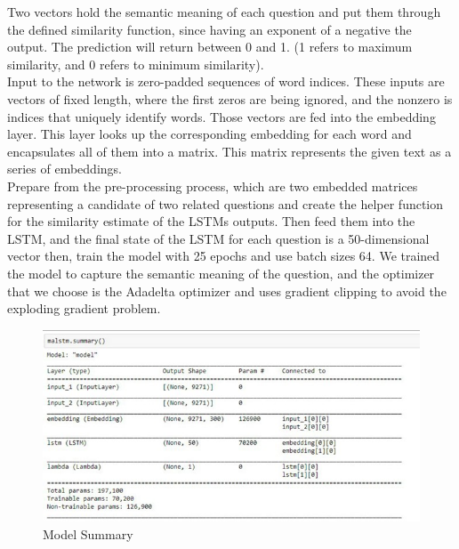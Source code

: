 \documentclass[12pt,oneside,openright,a4paper]{cpe-english-project}
\begin{document}
\begin{flushleft}
Two vectors hold the semantic meaning of each question and put them through the defined similarity function, since having an exponent of a negative the output. The prediction will return between 0 and 1. (1 refers to maximum similarity, and 0 refers to minimum similarity).\\
 Input to the network is zero-padded sequences of word indices. These inputs are vectors of fixed length, where the first zeros are being ignored, and the nonzero is indices that uniquely identify words. Those vectors are fed into the embedding layer. This layer looks up the corresponding embedding for each word and encapsulates all of them into a matrix. This matrix represents the given text as a series of embeddings.\\
Prepare from the pre-processing process, which are two embedded matrices representing a candidate of two related questions and create the helper function for the similarity estimate of the LSTMs outputs. Then feed them into the LSTM, and the final state of the LSTM for each question is a 50-dimensional vector then, train the model with 25 epochs and use batch sizes 64. We trained the model to capture the semantic meaning of the question, and the optimizer that we choose is the Adadelta optimizer and uses gradient clipping to avoid the exploding gradient problem.
\end{flushleft}

\begin{figure}[!h]
	\includegraphics[width=14cm]{img/ch3/Model Summary.jpg}
	\caption{Model Summary}\label{fig:Model Summary}
\end{figure}

\pagebreak
\end{document}
